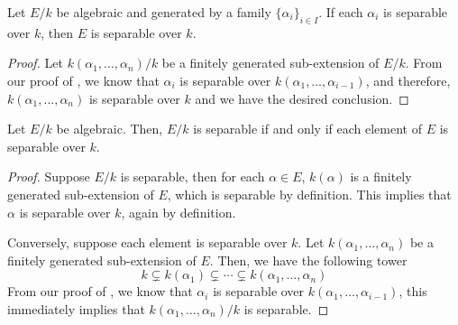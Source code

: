 \begin{theorem}
    Let $E/k$ be algebraic and generated by a family $\{\alpha_i\}_{i\in I}$. If each $\alpha_i$ is separable over $k$, then $E$ is separable over $k$.
\end{theorem}
\begin{proof}
    Let $k(\alpha_1,\ldots,\alpha_n)/k$ be a finitely generated sub-extension of $E/k$. From our proof of , we know that $\alpha_i$ is separable over $k(\alpha_1,\ldots,\alpha_{i - 1})$, and therefore, $k(\alpha_1,\ldots,\alpha_n)$ is separable over $k$ and we have the desired conclusion.
\end{proof}

\begin{theorem}
    Let $E/k$ be algebraic. Then, $E/k$ is separable if and only if each element of $E$ is separable over $k$.
\end{theorem}
\begin{proof}
    Suppose $E/k$ is separable, then for each $\alpha\in E$, $k(\alpha)$ is a finitely generated sub-extension of $E$, which is separable by definition. This implies that $\alpha$ is separable over $k$, again by definition.

    Conversely, suppose each element is separable over $k$. Let $k(\alpha_1,\ldots,\alpha_n)$ be a finitely generated sub-extension of $E$. Then, we have the following tower 
    \begin{equation*}
        k\subsetneq k(\alpha_1)\subsetneq\cdots\subsetneq k(\alpha_1,\ldots,\alpha_n)
    \end{equation*}
    From our proof of , we know that $\alpha_i$ is separable over $k(\alpha_1,\ldots,\alpha_{i-1})$, this immediately implies that $k(\alpha_1,\ldots,\alpha_n)/k$ is separable.
\end{proof}


